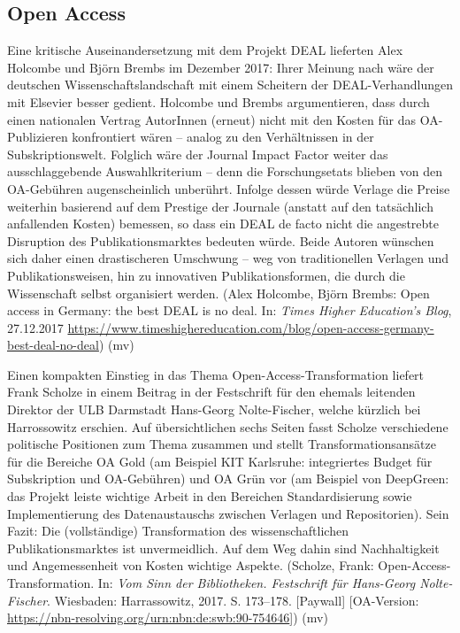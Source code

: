 \documentclass[a4paper,
fontsize=11pt,
oneside,
numbers=noperiodatend,
parskip=half-,
bibliography=totoc,
final
]{scrartcl}
\begin{document}
\hypertarget{open-access}{%
\subsection{Open Access}\label{open-access}}

Eine kritische Auseinandersetzung mit dem Projekt DEAL lieferten Alex
Holcombe und Björn Brembs im Dezember 2017: Ihrer Meinung nach wäre der
deutschen Wissenschaftslandschaft mit einem Scheitern der
DEAL-Verhandlungen mit Elsevier besser gedient. Holcombe und Brembs
argumentieren, dass durch einen nationalen Vertrag AutorInnen (erneut)
nicht mit den Kosten für das OA-Publizieren konfrontiert wären -- analog
zu den Verhältnissen in der Subskriptionswelt. Folglich wäre der Journal
Impact Factor weiter das ausschlaggebende Auswahlkriterium -- denn die
Forschungsetats blieben von den OA-Gebühren augenscheinlich unberührt.
Infolge dessen würde Verlage die Preise weiterhin basierend auf dem
Prestige der Journale (anstatt auf den tatsächlich anfallenden Kosten)
bemessen, so dass ein DEAL de facto nicht die angestrebte Disruption des
Publikationsmarktes bedeuten würde. Beide Autoren wünschen sich daher
einen drastischeren Umschwung -- weg von traditionellen Verlagen und
Publikationsweisen, hin zu innovativen Publikationsformen, die durch die
Wissenschaft selbst organisiert werden. (Alex Holcombe, Björn Brembs:
Open access in Germany: the best DEAL is no deal. In: \emph{Times Higher
Education's Blog}, 27.12.2017
\url{https://www.timeshighereducation.com/blog/open-access-germany-best-deal-no-deal})
(mv)

Einen kompakten Einstieg in das Thema Open-Access-Transformation liefert
Frank Scholze in einem Beitrag in der Festschrift für den ehemals
leitenden Direktor der ULB Darmstadt Hans-Georg Nolte-Fischer, welche
kürzlich bei Harrossowitz erschien. Auf übersichtlichen sechs Seiten
fasst Scholze verschiedene politische Positionen zum Thema zusammen und
stellt Transformationsansätze für die Bereiche OA Gold (am Beispiel KIT
Karlsruhe: integriertes Budget für Subskription und OA-Gebühren) und OA
Grün vor (am Beispiel von DeepGreen: das Projekt leiste wichtige Arbeit
in den Bereichen Standardisierung sowie Implementierung des
Datenaustauschs zwischen Verlagen und Repositorien). Sein Fazit: Die
(vollständige) Transformation des wissenschaftlichen Publikationsmarktes
ist unvermeidlich. Auf dem Weg dahin sind Nachhaltigkeit und
Angemessenheit von Kosten wichtige Aspekte. (Scholze, Frank:
Open-Access-Transformation. In: \emph{Vom Sinn der Bibliotheken.
Festschrift für Hans-Georg Nolte-Fischer}. Wiesbaden: Harrassowitz,
2017. S. 173--178. {[}Paywall{]} {[}OA-Version:
\url{https://nbn-resolving.org/urn:nbn:de:swb:90-754646}{]}) (mv)
\end{document}
